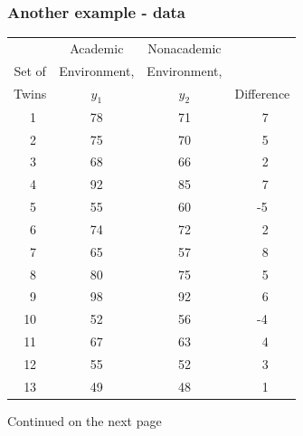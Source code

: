 \documentclass[xcolor=dvipsnames,12pt]{beamer}
\begin{document}
\begin{frame}
\frametitle{Another example - data}
\begin{tiny}
\begin{center}
\begin{tabular}{cccc} \hline
& \multicolumn{1}{c}{Academic} 
& \multicolumn{1}{c}{Nonacademic}  &\\
Set of & \multicolumn{1}{c}{Environment,} 
& \multicolumn{1}{c}{Environment,}  &\\
Twins & $y_1$ & $y_2$ & \multicolumn{1}{c}{Difference} \\ \hline
~1 & 78 & 71 & ~7 \\
~2 & 75 & 70 & ~5 \\
~3 & 68 & 66 & ~2 \\
~4 & 92 & 85 & ~7 \\
~5 & 55 & 60 & -5 \\
~6 & 74 & 72 & ~2 \\
~7 & 65 & 57 & ~8 \\
~8 & 80 & 75 & ~5 \\
~9 & 98 & 92 & ~6 \\
10 & 52 & 56 & -4 \\
11 & 67 & 63 & ~4 \\
12 & 55 & 52 & ~3 \\
13 & 49 & 48 & ~1 \\
\end{tabular}
\end{center}
\end{tiny}
 Continued on the next page
 \end{frame}
 
\end{document}
